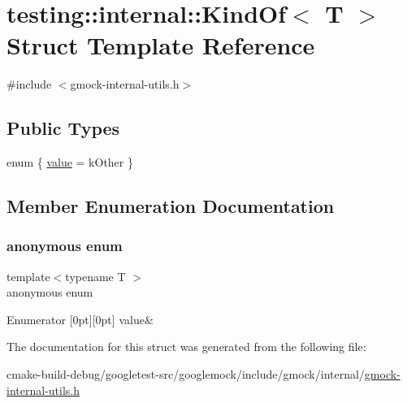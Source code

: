 \hypertarget{structtesting_1_1internal_1_1KindOf}{}\section{testing\+::internal\+::Kind\+Of$<$ T $>$ Struct Template Reference}
\label{structtesting_1_1internal_1_1KindOf}


{\ttfamily \#include $<$gmock-\/internal-\/utils.\+h$>$}

\subsection*{Public Types}
\begin{DoxyCompactItemize}
\item 
enum \{ \mbox{\hyperlink{structtesting_1_1internal_1_1KindOf_a4866389a4bc8d5522b5f8ae61a42f520a30d28b30579739dfb2d410825ac3aaa8}{value}} = k\+Other
 \}
\end{DoxyCompactItemize}


\subsection{Member Enumeration Documentation}
\mbox{\label{structtesting_1_1internal_1_1KindOf_a4866389a4bc8d5522b5f8ae61a42f520}} 
\subsubsection{\texorpdfstring{anonymous enum}{anonymous enum}}
{\footnotesize\ttfamily template$<$typename T $>$ \\
anonymous enum}

\begin{DoxyEnumFields}{Enumerator}
[0pt][0pt]{}\mbox{\label{structtesting_1_1internal_1_1KindOf_a4866389a4bc8d5522b5f8ae61a42f520a30d28b30579739dfb2d410825ac3aaa8}} 
value&\\
\hline

\end{DoxyEnumFields}


The documentation for this struct was generated from the following file\+:\begin{DoxyCompactItemize}
\item 
cmake-\/build-\/debug/googletest-\/src/googlemock/include/gmock/internal/\mbox{\hyperlink{gmock-internal-utils_8h}{gmock-\/internal-\/utils.\+h}}\end{DoxyCompactItemize}
